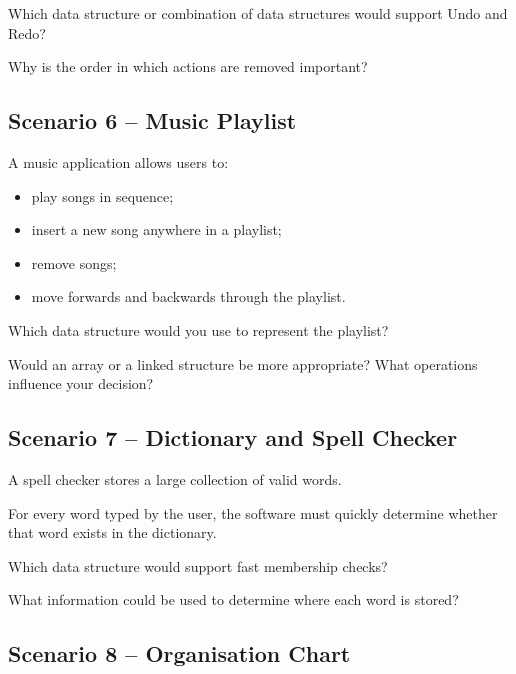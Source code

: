 \documentclass{csc2059practical}
\begin{document}
\begin{reflectionbox}
Which data structure or combination of data structures would support Undo and Redo?

Why is the order in which actions are removed important?
\end{reflectionbox}

\subsection*{Scenario 6 -- Music Playlist}

A music application allows users to:

\begin{itemize}
    \item play songs in sequence;
    \item insert a new song anywhere in a playlist;
    \item remove songs;
    \item move forwards and backwards through the playlist.
\end{itemize}

\begin{reflectionbox}
Which data structure would you use to represent the playlist?

Would an array or a linked structure be more appropriate? What operations influence your decision?
\end{reflectionbox}

\subsection*{Scenario 7 -- Dictionary and Spell Checker}

A spell checker stores a large collection of valid words.

For every word typed by the user, the software must quickly determine whether that word exists in the dictionary.

\begin{reflectionbox}
Which data structure would support fast membership checks?

What information could be used to determine where each word is stored?
\end{reflectionbox}

\subsection*{Scenario 8 -- Organisation Chart}
\end{document}
